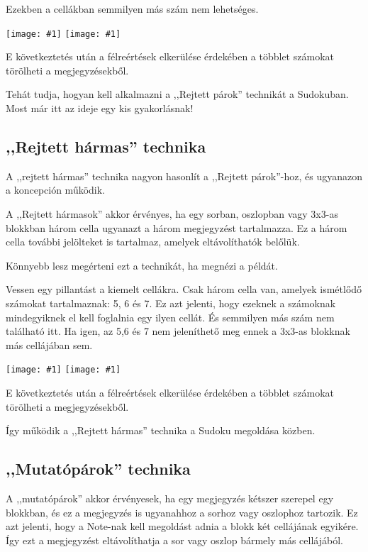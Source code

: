 \documentclass[a4paper,12pt,twoside]{article}
\newcommand{\kep}[1]{\texttt{[image: \#1]}}
\begin{document}
Ezekben a cellákban semmilyen más szám nem lehetséges.

\kep{1646980670-9. Hidden pairs_1.png}
\kep{1646980679-9. Hidden pairs_2.png}

E következtetés után a félreértések elkerülése érdekében a többlet számokat törölheti a megjegyzésekből.

Tehát tudja, hogyan kell alkalmazni a ,,Rejtett párok'' technikát a Sudokuban. Most már itt az ideje egy kis gyakorlásnak!

\clearpage
\subsection{,,Rejtett hármas'' technika}

A ,,rejtett hármas'' technika nagyon hasonlít a ,,Rejtett párok''-hoz, és ugyanazon a koncepción működik.

A ,,Rejtett hármasok'' akkor érvényes, ha egy sorban, oszlopban vagy 3x3-as blokkban három cella ugyanazt a három megjegyzést tartalmazza. Ez a három cella további jelölteket is tartalmaz, amelyek eltávolíthatók belőlük.

Könnyebb lesz megérteni ezt a technikát, ha megnézi a példát.

Vessen egy pillantást a kiemelt cellákra. Csak három cella van, amelyek ismétlődő számokat tartalmaznak: 5, 6 és 7. Ez azt jelenti, hogy ezeknek a számoknak mindegyiknek el kell foglalnia egy ilyen cellát. És semmilyen más szám nem található itt. Ha igen, az 5,6 és 7 nem jeleníthető meg ennek a 3x3-as blokknak más cellájában sem.

\kep{1672734920-10. Hidden triples_1.png}
\kep{1672734932-10. Hidden triples_2.png}

E következtetés után a félreértések elkerülése érdekében a többlet számokat törölheti a megjegyzésekből.

Így működik a ,,Rejtett hármas'' technika a Sudoku megoldása közben.


\subsection{,,Mutatópárok'' technika}

A ,,mutatópárok'' akkor érvényesek, ha egy megjegyzés kétszer szerepel egy blokkban, és ez a megjegyzés is ugyanahhoz a sorhoz vagy oszlophoz tartozik. Ez azt jelenti, hogy a Note-nak kell megoldást adnia a blokk két cellájának egyikére. Így ezt a megjegyzést eltávolíthatja a sor vagy oszlop bármely más cellájából.
\end{document}
